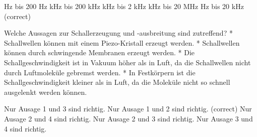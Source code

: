 \documentclass[11pt]{exam}
\begin{document}
\begin{questions}
\begin{choices}
	 Hz bis 200 Hz
	 kHz bis 200 kHz
	 kHz bis 2 kHz
	 kHz bis 20 MHz
	 Hz bis 20 kHz (correct)
\end{choices}

\vspace{3mm}\question Welche Aussagen zur Schallerzeugung und -ausbreitung sind zutreffend?	* Schallwellen können mit einem Piezo-Kristall erzeugt werden.	* Schallwellen können durch schwingende Membranen erzeugt werden.	* Die Schallgeschwindigkeit ist in Vakuum höher als in Luft, da die Schallwellen nicht durch Luftmoleküle gebremst werden.	* In Festkörpern ist die Schallgeschwindigkeit kleiner als in Luft, da die Moleküle nicht so schnell ausgelenkt werden können. 

\begin{choices}
	\choice Nur Ausage 1 und 3 sind richtig.
	\choice Nur Ausage 1 und 2 sind richtig. (correct)
	\choice Nur Ausage 2 und 4 sind richtig.
	\choice Nur Ausage 2 und 3 sind richtig.
	\choice Nur Ausage 3 und 4 sind richtig.
\end{choices}

\vspace{3mm}\end{questions}
\end{document}
